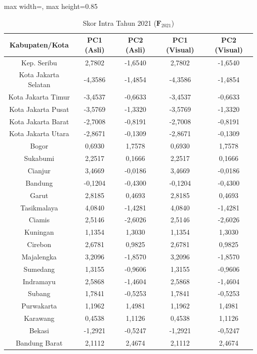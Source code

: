 \begin{table}[H]
\centering
\caption{Skor Intra Tahun 2021 ($\mathbf{F}_{2021}$)} \label{tab:app2skor_intra_2021}
\begin{adjustbox}{max width=\textwidth, max height=0.85\textheight}
\begin{tabular}{|c|c|c|c|c|}
\hline
\textbf{Kabupaten/Kota} & \textbf{PC1 (Asli)} & \textbf{PC2 (Asli)} & \textbf{PC1 (Visual)} & \textbf{PC2 (Visual)} \\
\hline
Kep. Seribu & 2,7802 & -1,6540 & 2,7802 & -1,6540 \\
Kota Jakarta Selatan & -4,3586 & -1,4854 & -4,3586 & -1,4854 \\
Kota Jakarta Timur & -3,4537 & -0,6633 & -3,4537 & -0,6633 \\
Kota Jakarta Pusat & -3,5769 & -1,3320 & -3,5769 & -1,3320 \\
Kota Jakarta Barat & -2,7008 & -0,8191 & -2,7008 & -0,8191 \\
Kota Jakarta Utara & -2,8671 & -0,1309 & -2,8671 & -0,1309 \\
Bogor & 0,6930 & 1,7578 & 0,6930 & 1,7578 \\
Sukabumi & 2,2517 & 0,1666 & 2,2517 & 0,1666 \\
Cianjur & 3,4669 & -0,0186 & 3,4669 & -0,0186 \\
Bandung & -0,1204 & -0,4300 & -0,1204 & -0,4300 \\
Garut & 2,8185 & 0,4693 & 2,8185 & 0,4693 \\
Tasikmalaya & 4,0840 & -1,4281 & 4,0840 & -1,4281 \\
Ciamis & 2,5146 & -2,6026 & 2,5146 & -2,6026 \\
Kuningan & 1,1354 & 1,3030 & 1,1354 & 1,3030 \\
Cirebon & 2,6781 & 0,9825 & 2,6781 & 0,9825 \\
Majalengka & 3,2096 & -1,8570 & 3,2096 & -1,8570 \\
Sumedang & 1,3155 & -0,9606 & 1,3155 & -0,9606 \\
Indramayu & 2,5868 & -1,4604 & 2,5868 & -1,4604 \\
Subang & 1,7841 & -0,5253 & 1,7841 & -0,5253 \\
Purwakarta & 1,1962 & 1,4981 & 1,1962 & 1,4981 \\
Karawang & 0,4538 & 1,1126 & 0,4538 & 1,1126 \\
Bekasi & -1,2921 & -0,5247 & -1,2921 & -0,5247 \\
Bandung Barat & 2,1112 & 2,4674 & 2,1112 & 2,4674 \\

\end{tabular}
\end{adjustbox}
\end{table}
